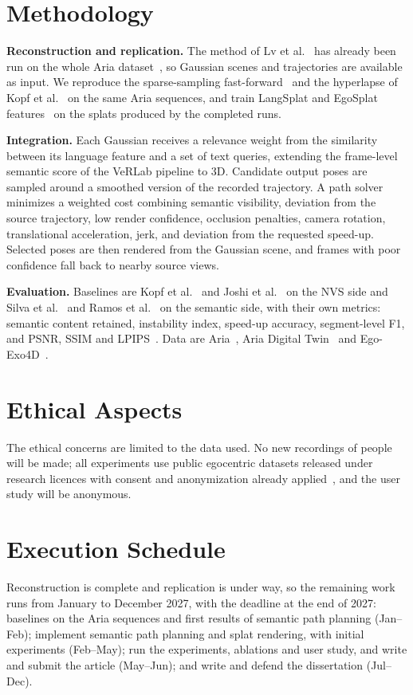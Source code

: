 \documentclass[
	mscproposta, %
	english %
]{../ppgccufmg}
\begin{document}
    \section{Methodology}
        \textbf{Reconstruction and replication.} The method of Lv et al.~\cite{lv2025photoreal} has already been run on the whole Aria dataset~\cite{engel2023aria}, so Gaussian scenes and trajectories are available as input. We reproduce the sparse-sampling fast-forward~\cite{silva2021sparse} and the hyperlapse of Kopf et al.~\cite{kopf2014hyperlapse} on the same Aria sequences, and train LangSplat and EgoSplat features~\cite{qin2024langsplat,li2025egosplat} on the splats produced by the completed runs.

        \textbf{Integration.} Each Gaussian receives a relevance weight from the similarity between its language feature and a set of text queries, extending the frame-level semantic score of the VeRLab pipeline to 3D. Candidate output poses are sampled around a smoothed version of the recorded trajectory. A path solver minimizes a weighted cost combining semantic visibility, deviation from the source trajectory, low render confidence, occlusion penalties, camera rotation, translational acceleration, jerk, and deviation from the requested speed-up. Selected poses are then rendered from the Gaussian scene, and frames with poor confidence fall back to nearby source views.

        \textbf{Evaluation.} Baselines are Kopf et al.~\cite{kopf2014hyperlapse} and Joshi et al.~\cite{joshi2015realtime} on the NVS side and Silva et al.~\cite{silva2021sparse} and Ramos et al.~\cite{ramos2022text} on the semantic side, with their own metrics: semantic content retained, instability index, speed-up accuracy, segment-level F1, and PSNR, SSIM and LPIPS~\cite{zhang2018lpips}. Data are Aria~\cite{engel2023aria}, Aria Digital Twin~\cite{pan2023adt} and Ego-Exo4D~\cite{grauman2024egoexo4d}.
    \section{Ethical Aspects}
        The ethical concerns are limited to the data used. No new recordings of people will be made; all experiments use public egocentric datasets released under research licences with consent and anonymization already applied~\cite{engel2023aria,pan2023adt}, and the user study will be anonymous.
    \section{Execution Schedule}
        Reconstruction is complete and replication is under way, so the remaining work runs from January to December 2027, with the deadline at the end of 2027: baselines on the Aria sequences and first results of semantic path planning (Jan--Feb); implement semantic path planning and splat rendering, with initial experiments (Feb--May); run the experiments, ablations and user study, and write and submit the article (May--Jun); and write and defend the dissertation (Jul--Dec).
\end{document}
